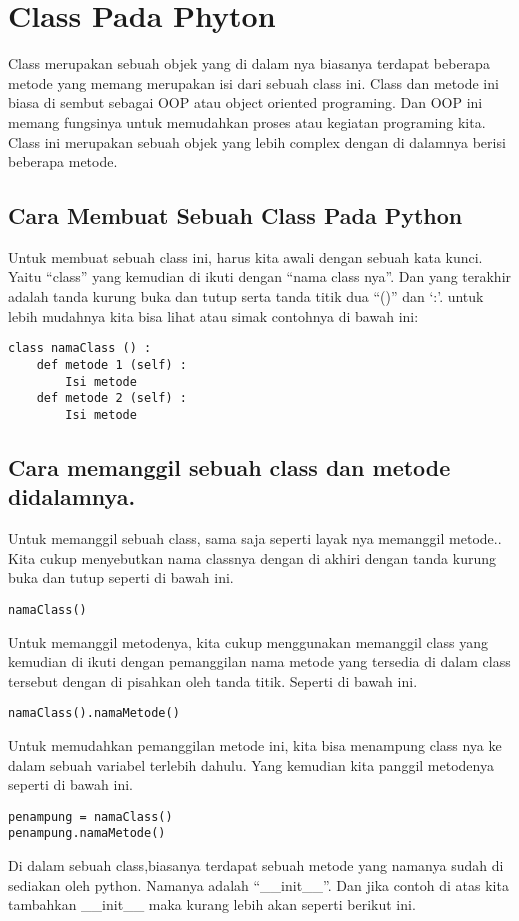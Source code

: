 \chapter{Class Pada Phyton}
\par Class merupakan sebuah objek yang di dalam nya biasanya terdapat beberapa metode yang memang merupakan isi dari sebuah class ini. Class dan metode ini biasa di sembut sebagai OOP atau object oriented programing. Dan OOP ini memang fungsinya untuk memudahkan proses atau kegiatan programing kita. Class ini merupakan sebuah objek yang lebih complex dengan di dalamnya berisi beberapa metode.
\section{Cara Membuat Sebuah Class Pada Python}
Untuk membuat sebuah class ini, harus kita awali dengan sebuah kata kunci. Yaitu “class” yang kemudian di ikuti dengan “nama class nya”. Dan yang terakhir adalah tanda kurung buka dan tutup serta tanda titik dua “()” dan ‘:’.  untuk lebih mudahnya kita bisa lihat atau simak contohnya di bawah ini:
\begin{lstlisting}
class namaClass () :
    def metode 1 (self) :
        Isi metode
    def metode 2 (self) :
        Isi metode
\end{lstlisting}
\newpage \section{Cara memanggil sebuah class dan metode didalamnya.}
Untuk memanggil sebuah class, sama saja seperti layak nya memanggil metode.. Kita cukup menyebutkan nama classnya dengan di akhiri dengan tanda kurung buka dan tutup seperti di bawah ini.
\begin{lstlisting}
namaClass()
\end{lstlisting}
Untuk memanggil metodenya, kita cukup menggunakan memanggil class yang kemudian di ikuti dengan pemanggilan nama metode yang tersedia di dalam class tersebut dengan di pisahkan oleh tanda titik. Seperti di bawah ini.
\begin{lstlisting}
namaClass().namaMetode()
\end{lstlisting}
Untuk memudahkan pemanggilan metode ini, kita bisa menampung class nya ke dalam sebuah variabel terlebih dahulu. Yang kemudian kita panggil metodenya seperti di bawah ini.
\begin{lstlisting}
penampung = namaClass()
penampung.namaMetode()
\end{lstlisting}
Di dalam sebuah class,biasanya terdapat sebuah metode yang namanya sudah di sediakan oleh python. Namanya adalah “\_\_init\_\_”. Dan jika contoh di atas kita tambahkan \_\_init\_\_ maka kurang lebih akan seperti berikut ini.

